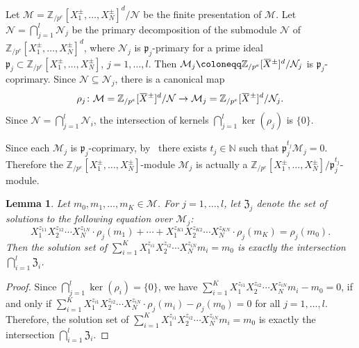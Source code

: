 \documentclass[letterpaper, 11pt, thm-restate]{article}
\numberwithin{equation}{section}
\newcommand{\N}{\mathbb{N}}
\newcommand{\Zpe}{\mathbb{Z}_{/p^e}}
\newcommand{\mM}{\mathcal{M}}
\newcommand{\mN}{\mathcal{N}}
\newcommand{\mZ}{\mathfrak{Z}}
\newcommand{\oX}{\mkern 1.5mu\overline{\mkern-1.5mu X \mkern-1.5mu}\mkern 1.5mu}
\newcommand{\frp}{\mathfrak{p}}
\newtheorem{lem}[thrm]{Lemma}
\theoremstyle{definition}
\theoremstyle{definition}
\theoremstyle{definition}
\begin{document}
Let $\mM = \Zpe[X_1^{\pm}, \ldots, X_N^{\pm}]^d/\mN$ be the finite presentation of $\mM$.
Let $\mN = \bigcap_{j = 1}^l \mN_j$ be the primary decomposition of the submodule $\mN$ of $\Zpe[X_1^{\pm}, \ldots, X_N^{\pm}]^d$, where $\mN_j$ is $\frp_j$-primary for a prime ideal $\frp_j \subset \Zpe[X_1^{\pm}, \ldots, X_N^{\pm}]$, $j = 1, \ldots, l$.
Then $\mM_j \coloneqq \Zpe[\oX^{\pm}]^d/\mN_j$ is $\frp_j$-coprimary.
Since $\mN \subseteq \mN_j$, there is a canonical map 
\[
\rho_j \colon \mM = \Zpe[\oX^{\pm}]^d/\mN \rightarrow \mM_j = \Zpe[\oX^{\pm}]^d/\mN_j.
\]
Since $\mN = \bigcap_{j = 1}^l \mN_i$, the intersection of kernels $\bigcap_{j=1}^l \ker(\rho_j)$ is $\{0\}$.

Since each $\mM_j$ is $\frp_j$-coprimary, by~\cite[Proposition~3.9]{eisenbud2013commutative} there exists $t_j \in \N$ such that $\frp_j^{t_j} \mM_j = 0$.
Therefore the $\Zpe[X_1^{\pm}, \ldots, X_N^{\pm}]$-module $\mM_j$ is actually a $\Zpe[X_1^{\pm}, \ldots, X_N^{\pm}]/\frp_j^{t_j}$-module.

\begin{lem}\label{lem:inter}
    Let $m_0, m_1, \ldots, m_K \in \mM$.
    For $j = 1, \ldots, l$, let $\mZ_j$ denote the set of solutions to the following equation over $\mM_j$:
    \begin{equation}\label{eq:Suniti}
        X_1^{z_{11}} X_2^{z_{12}} \cdots X_N^{z_{1N}} \cdot \rho_j(m_1) + \cdots + X_1^{z_{K1}} X_2^{z_{K2}} \cdots X_N^{z_{KN}} \cdot \rho_j(m_K) = \rho_j(m_0).
    \end{equation}
    Then the solution set of $\sum_{i = 1}^K X_1^{z_{i1}} X_2^{z_{i2}} \cdots X_N^{z_{iN}} m_i = m_0$ is exactly the intersection $\bigcap_{i = 1}^l \mZ_i$.
\end{lem}
\begin{proof}
    Since $\bigcap_{j=1}^l \ker(\rho_i) = \{0\}$, we have
    $
    \sum_{i = 1}^K X_1^{z_{i1}} X_2^{z_{i2}} \cdots X_N^{z_{iN}} m_i - m_0 = 0
    $,
    if and only if 
    $
    \sum_{i = 1}^K X_1^{z_{i1}} X_2^{z_{i2}} \cdots X_N^{z_{iN}} \cdot \rho_j( m_i) - \rho_j(m_0) = 0
    $
    for all $j = 1, \ldots, l$.
    Therefore, the solution set of $\sum_{i = 1}^K X_1^{z_{i1}} X_2^{z_{i2}} \cdots X_N^{z_{iN}} m_i = m_0$ is exactly the intersection $\bigcap_{i = 1}^l \mZ_i$.
\end{proof}

\end{document}
